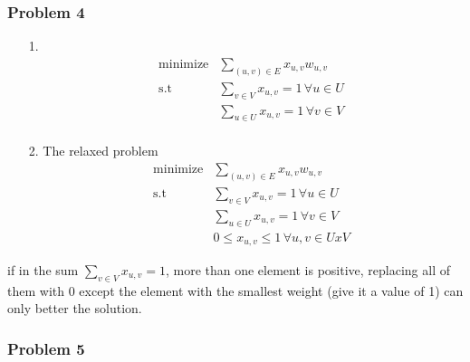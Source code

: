 \documentclass[12pt]{article}
\newcommand{\Q}[1]{\subsubsection*{Problem #1}}
\begin{document}
\Q{4}
\begin{itemize}
\item [1.]
\begin{align*}
    &\text{minimize} & \sum_{(u, v) \in E} x_{u, v} w_{u, v} \\
    &\text{s.t}      & \sum_{v \in V} x_{u,v}  = 1 \, \forall u \in U \\
    &                & \sum_{u \in U} x_{u,v}  = 1 \, \forall v \in V \\
\end{align*}

\item [2.] The relaxed problem
\begin{align*}
    &\text{minimize} & \sum_{(u, v) \in E} x_{u, v} w_{u, v} \\
    &\text{s.t}      & \sum_{v \in V} x_{u,v}  = 1 \, \forall u \in U \\
    &                & \sum_{u \in U} x_{u,v}  = 1 \, \forall v \in V \\
    &                & 0 \leq x_{u,v} \leq 1 \, \forall u,v \in UxV 
\end{align*}
\end{itemize}

if in the sum $\sum_{v \in V} x_{u,v}  = 1$, more than one element is positive, replacing all of them with 0 except the element with the smallest weight (give it a value of 1) can only better the solution.

\Q{5}
\end{document}
